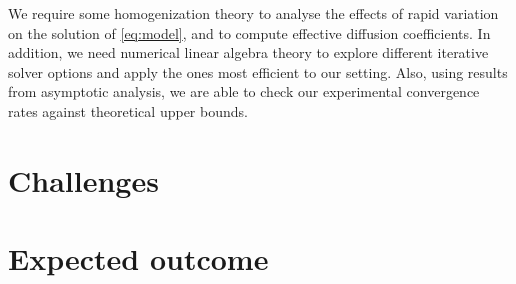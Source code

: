 \documentclass{article}
\begin{document}
We require some homogenization theory to analyse the effects of rapid variation on the solution of \eqref{eq:model}, and to compute effective diffusion coefficients. 
In addition, we need numerical linear algebra theory to explore different iterative solver options and apply the ones most efficient to our setting. 
Also, using results from asymptotic analysis, we are able to check our experimental convergence rates against theoretical upper bounds.

\section{Challenges}
\label{sec:challenges}

\section{Expected outcome}
\label{sec:expected_outcome}
\end{document}
